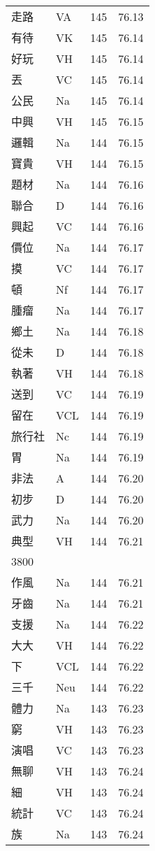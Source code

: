 \documentclass[twocolumn]{book}
\begin{document}
\begin{supertabular}{llrr}
走路 & VA & 145 &  76.13\\
有待 & VK & 145 &  76.14\\
好玩 & VH & 145 &  76.14\\
丟 & VC & 145 &  76.14\\
公民 & Na & 145 &  76.14\\
中興 & VH & 145 &  76.15\\
邏輯 & Na & 144 &  76.15\\
寶貴 & VH & 144 &  76.15\\
題材 & Na & 144 &  76.16\\
聯合 & D & 144 &  76.16\\
興起 & VC & 144 &  76.16\\
價位 & Na & 144 &  76.17\\
摸 & VC & 144 &  76.17\\
頓 & Nf & 144 &  76.17\\
腫瘤 & Na & 144 &  76.17\\
鄉土 & Na & 144 &  76.18\\
從未 & D & 144 &  76.18\\
執著 & VH & 144 &  76.18\\
送到 & VC & 144 &  76.19\\
留在 & VCL & 144 &  76.19\\
旅行社 & Nc & 144 &  76.19\\
胃 & Na & 144 &  76.19\\
非法 & A & 144 &  76.20\\
初步 & D & 144 &  76.20\\
武力 & Na & 144 &  76.20\\
典型 & VH & 144 &  76.21\\
3800\\
作風 & Na & 144 &  76.21\\
牙齒 & Na & 144 &  76.21\\
支援 & Na & 144 &  76.22\\
大大 & VH & 144 &  76.22\\
下 & VCL & 144 &  76.22\\
三千 & Neu & 144 &  76.22\\
體力 & Na & 143 &  76.23\\
窮 & VH & 143 &  76.23\\
演唱 & VC & 143 &  76.23\\
無聊 & VH & 143 &  76.24\\
細 & VH & 143 &  76.24\\
統計 & VC & 143 &  76.24\\
族 & Na & 143 &  76.24\\

\end{supertabular}
\end{document}

